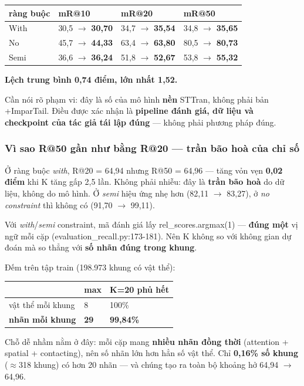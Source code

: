\documentclass[11pt,a4paper]{article}
\newcommand{\code}[1]{{\ttfamily\small\color{codetext}#1}}
\begin{document}
\begin{center}\small
\begin{tabular}{@{}llll@{}}
\toprule
\textbf{ràng buộc} & \textbf{mR@10} & \textbf{mR@20} & \textbf{mR@50}\\
\midrule
With & 30,5 $\rightarrow$ \textbf{30,70} & 34,7 $\rightarrow$ \textbf{35,54} & 34,8 $\rightarrow$ \textbf{35,65}\\
No & 45,7 $\rightarrow$ \textbf{44,33} & 63,4 $\rightarrow$ \textbf{63,80} & 80,5 $\rightarrow$ \textbf{80,73}\\
Semi & 36,6 $\rightarrow$ \textbf{36,24} & 51,8 $\rightarrow$ \textbf{52,67} & 53,8 $\rightarrow$ \textbf{55,32}\\
\bottomrule
\end{tabular}
\end{center}
\textbf{Lệch trung bình 0,74 điểm, lớn nhất 1,52.}

Cần nói rõ phạm vi: đây là số của mô hình \textbf{nền} STTran, không phải bản +ImparTail. Điều được xác nhận là \textbf{pipeline đánh giá, dữ liệu và checkpoint của tác giả tái lập đúng} --- không phải phương pháp đúng.

\subsubsection{Vì sao R@50 gần như bằng R@20 --- trần bão hoà của chỉ số}
Ở ràng buộc \emph{with}, R@20 = 64,94 nhưng R@50 = 64,96 --- tăng vỏn vẹn \textbf{0,02 điểm} khi K tăng gấp 2,5 lần. Không phải nhiễu: đây là \textbf{trần bão hoà} do dữ liệu, không do mô hình. Ở \emph{semi} hiệu ứng nhẹ hơn (82,11 $\rightarrow$ 83,27), ở \emph{no constraint} thì không có (91,70 $\rightarrow$ 99,11).

Với \emph{with}/\emph{semi} constraint, mã đánh giá lấy \code{rel\_scores.argmax(1)} --- \textbf{đúng một} vị ngữ mỗi cặp (\code{evaluation\_recall.py:173-181}). Nên K không so với không gian dự đoán mà so thẳng với \textbf{số nhãn đúng trong khung}.

Đếm trên tập train (198.973 khung có vật thể):

\begin{center}\small
\begin{tabular}{@{}lll@{}}
\toprule
\textbf{} & \textbf{max} & \textbf{K=20 phủ hết}\\
\midrule
vật thể mỗi khung & 8 & 100\%\\
\textbf{nhãn mỗi khung} & \textbf{29} & \textbf{99,84\%}\\
\bottomrule
\end{tabular}
\end{center}
Chỗ dễ nhầm nằm ở đây: mỗi cặp mang \textbf{nhiều nhãn đồng thời} (attention + spatial + contacting), nên số nhãn lớn hơn hẳn số vật thể. Chỉ \textbf{0,16\% số khung} ($\approx$318 khung) có hơn 20 nhãn --- và chúng tạo ra toàn bộ khoảng hở 64,94 $\rightarrow$ 64,96.
\end{document}
